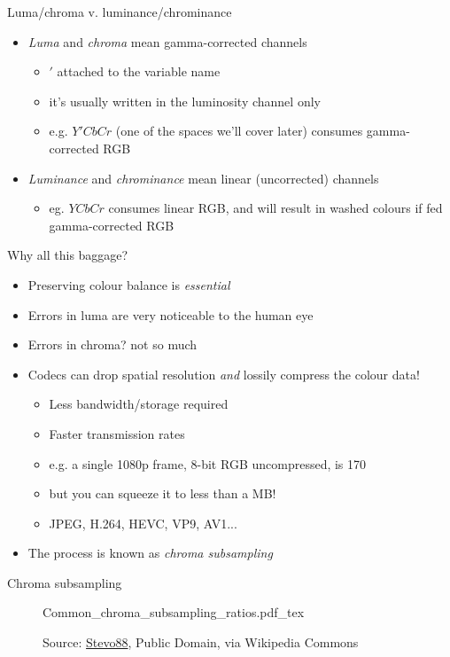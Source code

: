 \documentclass[aspectratio=169,handout,usepdftitle=false]{fireshonks}
\begin{document}
\begin{frame}{Luma/chroma v. luminance/chrominance}
    \begin{itemize}
        \item \emph{Luma} and \emph{chroma} mean gamma-corrected channels
              \begin{itemize}
                  \item $'$ attached to the variable name
                  \item it's usually written in the luminosity channel only
                  \item e.g. $Y'CbCr$ (one of the spaces we'll cover later) consumes gamma-corrected RGB
              \end{itemize}
        \item \emph{Luminance} and \emph{chrominance} mean linear (uncorrected) channels
              \begin{itemize}
                  \item eg. $YCbCr$ consumes linear RGB, and will result in washed colours if fed gamma-corrected RGB
              \end{itemize}
    \end{itemize}
\end{frame}
\begin{frame}{Why all this baggage?}
    \begin{itemize}
        \item Preserving colour balance is \emph{essential}
        \item Errors in luma are very noticeable to the human eye
        \item Errors in chroma? not so much
        \item Codecs can drop spatial resolution \emph{and} lossily compress the colour data!
              \begin{itemize}
                  \item Less bandwidth/storage required
                  \item Faster transmission rates
                  \item e.g. a single 1080p frame, 8-bit RGB uncompressed, is \SI{170}{\mega\byte}
                  \item but you can squeeze it to less than a MB!
                  \item JPEG, H.264, HEVC, VP9, AV1... 
              \end{itemize}
        \item The process is known as \emph{chroma subsampling}
    \end{itemize}
\end{frame}
\begin{frame}{Chroma subsampling}
    \begin{figure}
        \centering
        \def\svgwidth{.6\textwidth}
        {Common_chroma_subsampling_ratios.pdf_tex}
        \caption*{Source: \href{https://commons.wikimedia.org/wiki/File:Common_chroma_subsampling_ratios.svg}{Stevo88}, Public Domain, via Wikipedia Commons}
    \end{figure}
\end{frame}
\end{document}
